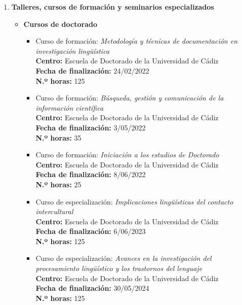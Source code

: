 \begin{enumerate}[label=\alph*)]
\begin{itemize}
        
        \end{itemize}

  \item \textbf{Talleres, cursos de formación y seminarios especializados}

  \begin{itemize}
  \item \textbf{Cursos de doctorado}
  \begin{itemize}[label=\textbullet]
  \item Curso de formaci\'on: \textit{Metodolog\'ia y t\'ecnicas de documentaci\'on en investigaci\'on ling\"u\'istica}\\
  \textbf{Centro:} Escuela de Doctorado de la Universidad de C\'adiz\\
  \textbf{Fecha de finalizaci\'on:} 24/02/2022\\
  \textbf{N.º horas:} 125

  \item Curso de formaci\'on: \textit{B\'usqueda, gesti\'on y comunicaci\'on de la informaci\'on cient\'ifica}\\
  \textbf{Centro:} Escuela de Doctorado de la Universidad de C\'adiz\\
  \textbf{Fecha de finalizaci\'on:} 3/05/2022\\
  \textbf{N.º horas:} 35

  \item Curso de formaci\'on: \textit{Iniciaci\'on a los estudios de Doctorado}\\
  \textbf{Centro:} Escuela de Doctorado de la Universidad de C\'adiz\\
  \textbf{Fecha de finalizaci\'on:} 8/06/2022\\
  \textbf{N.º horas:} 25

  \item Curso de especializaci\'on: \textit{Implicaciones ling\"u\'isticas del contacto intercultural}\\
  \textbf{Centro:} Escuela de Doctorado de la Universidad de C\'adiz\\
  \textbf{Fecha de finalizaci\'on:} 6/06/2023\\
  \textbf{N.º horas:} 125

    \item Curso de especializaci\'on: \textit{Avances en la investigaci\'on del procesamiento ling\"u\'istico y los trastornos del lenguaje}\\
  \textbf{Centro:} Escuela de Doctorado de la Universidad de C\'adiz\\
  \textbf{Fecha de finalizaci\'on:} 30/05/2024\\
  \textbf{N.º horas:} 125


\end{itemize}
\end{itemize}
\end{enumerate}
